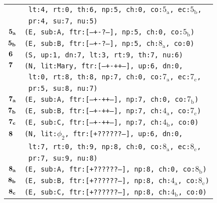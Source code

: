 \documentclass{article}
\begin{document}
\begin{minipage}{\textwidth}
{\begin{tabular}{|r|l|}
    & \texttt{\texttt{~lt:4,~rt:0,~th:6,~np:5,~ch:0,~co:${\textrm{5}_{\textrm{a}}}$,~ec:${\textrm{5}_{\textrm{b}}}$,}} \\
    & \texttt{\texttt{~pr:4,~su:7,~nu:5)}} \\
    ${\textbf{\textrm{5}}_{\textbf{\textrm{a}}}}$ & \texttt{\texttt{(E,~sub:A,~ftr:[---+-?---],~np:5,~ch:0,~co:${\textrm{5}_{\textrm{b}}}$)}} \\
    ${\textbf{\textrm{5}}_{\textbf{\textrm{b}}}}$ & \texttt{\texttt{(E,~sub:B,~ftr:[---+-?---],~np:5,~ch:${\textrm{8}_{\textrm{a}}}$,~co:0)}} \\
    ${\textbf{\textrm{6}}_{\phantom{z}}}$ & \texttt{\texttt{(S,~up:1,~dn:7,~lt:3,~rt:9,~th:7,~nu:6)}} \\
    ${\textbf{\textrm{7}}_{\phantom{z}}}$ & \texttt{\texttt{(N,~lit:Mary,~ftr:[---+-++--],~up:6,~dn:0,}} \\
    & \texttt{\texttt{~lt:0,~rt:8,~th:8,~np:7,~ch:0,~co:${\textrm{7}_{\textrm{a}}}$,~ec:${\textrm{7}_{\textrm{c}}}$,}} \\
    & \texttt{\texttt{~pr:5,~su:8,~nu:7)}} \\
    ${\textbf{\textrm{7}}_{\textbf{\textrm{a}}}}$ & \texttt{\texttt{(E,~sub:A,~ftr:[---+-++--],~np:7,~ch:0,~co:${\textrm{7}_{\textrm{b}}}$)}} \\
    ${\textbf{\textrm{7}}_{\textbf{\textrm{b}}}}$ & \texttt{\texttt{(E,~sub:B,~ftr:[---+-++--],~np:7,~ch:${\textrm{4}_{\textrm{a}}}$,~co:${\textrm{7}_{\textrm{c}}}$)}} \\
    ${\textbf{\textrm{7}}_{\textbf{\textrm{c}}}}$ & \texttt{\texttt{(E,~sub:C,~ftr:[---+-++--],~np:7,~ch:${\textrm{4}_{\textrm{b}}}$,~co:0)}} \\
    ${\textbf{\textrm{8}}_{\phantom{z}}}$ & \texttt{\texttt{(N,~lit:${\phi_{\textrm{2}}}$,~ftr:[+??????--],~up:6,~dn:0,}} \\
    & \texttt{\texttt{~lt:7,~rt:0,~th:9,~np:8,~ch:0,~co:${\textrm{8}_{\textrm{a}}}$,~ec:${\textrm{8}_{\textrm{c}}}$,}} \\
    & \texttt{\texttt{~pr:7,~su:9,~nu:8)}} \\
    ${\textbf{\textrm{8}}_{\textbf{\textrm{a}}}}$ & \texttt{\texttt{(E,~sub:A,~ftr:[+??????--],~np:8,~ch:0,~co:${\textrm{8}_{\textrm{b}}}$)}} \\
    ${\textbf{\textrm{8}}_{\textbf{\textrm{b}}}}$ & \texttt{\texttt{(E,~sub:B,~ftr:[+??????--],~np:8,~ch:${\textrm{4}_{\textrm{a}}}$,~co:${\textrm{8}_{\textrm{c}}}$)}} \\
    ${\textbf{\textrm{8}}_{\textbf{\textrm{c}}}}$ & \texttt{\texttt{(E,~sub:C,~ftr:[+??????--],~np:8,~ch:${\textrm{4}_{\textrm{b}}}$,~co:0)}} \\

\end{tabular}}
\end{minipage}
\end{document}
